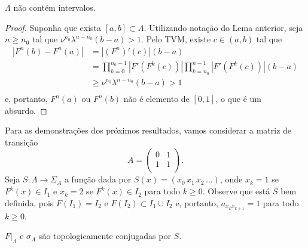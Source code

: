 \begin{lemma}
$\Lambda$ não contém intervalos.
\end{lemma}

\begin{proof}
Suponha que exista $[a, b] \subset \Lambda$. Utilizando notação do Lema anterior, seja $n \geq n_0$ tal que $\nu^{n_0} \lambda^{n - n_0} (b - a) > 1$. Pelo TVM, existe $c \in (a, b)$ tal que
\begin{align*}
|F^n(b) - F^n(a)| & = |(F^n)'(c)|(b-a) \\
& = \prod_{k=0}^{n_0-1} |F'(F^k(c))| \prod_{k=n_0}^{n-1} |F'(F^k(c))| (b-a) \\
& \geq \nu^{n_0} \lambda^{n-n_0} (b-a) > 1 \\
\end{align*}
e, portanto, $F^n(a)$ ou $F^n(b)$ não é elemento de $[0,1]$, o que é um absurdo.
\end{proof}

Para as demonstrações dos próximos resultados, vamos considerar a matriz de transição
$$A =
\begin{pmatrix}
0 & 1 \\
1 & 1 \\
\end{pmatrix}.$$
Seja $S: \Lambda \to \Sigma_A$ a função dada por $S(x) = (x_0 \, x_1 \, x_2 \, \dots)$, onde $x_k = 1$ se $F^k(x) \in I_1$ e $x_k = 2$ se $F^k(x) \in I_2$ para todo $k \geq 0$. Observe que está $S$ bem definida, pois $F(I_1) = I_2$ e $F(I_2) \subset I_1 \cup I_2$ e, portanto, $a_{x_k x_{k+1}} = 1$ para todo $k \geq 0$. 

\begin{proposition}
$F|_\Lambda$ e $\sigma_A$ são topologicamente conjugadas por $S$.
\end{proposition}

